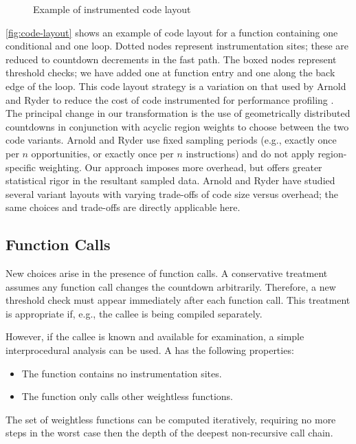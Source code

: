 \begin{figure}
  \centering
  
  \caption{Example of instrumented code layout}
  \label{fig:code-layout}
\end{figure}

\autoref{fig:code-layout} shows an example of code layout for a
function containing one conditional and one loop.  Dotted nodes
represent instrumentation sites; these are reduced to countdown
decrements in the fast path.  The boxed nodes represent threshold
checks; we have added one at function entry and one along the back
edge of the loop.  This code layout strategy is a
variation on that used by Arnold and Ryder to reduce the cost of code
instrumented for performance profiling \cite{Arnold:2001:FRC}.  The
principal change in our transformation is the use of geometrically
distributed countdowns in conjunction with acyclic region weights to
choose between the two code variants.  Arnold and Ryder use fixed
sampling periods (e.g., exactly once per $n$ opportunities, or exactly
once per $n$ instructions) and do not apply region-specific weighting.
Our approach imposes more overhead, but offers greater statistical
rigor in the resultant sampled data.  Arnold and Ryder have studied
several variant layouts with varying trade-offs of code size versus
overhead; the same choices and trade-offs are directly applicable
here.

\subsection{Function Calls}

New choices arise in the presence of function calls.  A conservative
treatment assumes any function call changes the countdown arbitrarily.
Therefore, a new threshold check must appear immediately after each
function call.  This treatment is appropriate if, e.g., the callee is
being compiled separately.

However, if the callee is known and available for examination, a
simple interprocedural analysis can be used.  A
 has the following properties:

\begin{itemize}
\item The function contains no instrumentation sites.
\item The function only calls other weightless functions.
\end{itemize}

The set of weightless functions can be computed iteratively, requiring
no more steps in the worst case then the depth of the deepest
non-recursive call chain.

